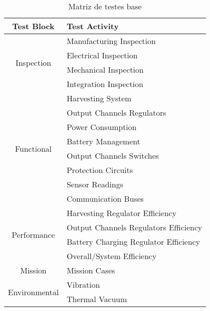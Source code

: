 \begin{table}
    \ABNTEXfontereduzida
    \centering
    \caption{Matriz de testes base}
    \begin{tabular}{cl}
        \toprule
        \textbf{Test Block} & \textbf{Test Activity} \\
        \midrule
        \midrule
        \multirow{4}{*}{Inspection}     & Manufacturing Inspection              \\
                                        & Electrical Inspection                 \\
                                        & Mechanical Inspection                 \\
                                        & Integration Inspection                \\
        \midrule
        \multirow{8}{*}{Functional}     & Harvesting System                     \\
                                        & Output Channels Regulators            \\
                                        & Power Consumption                     \\
                                        & Battery Management            \\
                                        & Output Channels Switches              \\
                                        & Protection Circuits                   \\
                                        & Sensor Readings                       \\
                                        & Communication Buses                   \\
        \midrule
        \multirow{4}{*}{Performance}    & Harvesting Regulator Efficiency       \\
                                        & Output Channels Regulators Efficiency \\
                                        & Battery Charging Regulator Efficiency \\
                                        & Overall/System Efficiency             \\
        \midrule
        Mission                         & Mission Cases                         \\
        \midrule
        \multirow{2}{*}{Environmental}  & Vibration                             \\
                                        & Thermal Vacuum                        \\
        \bottomrule
    \end{tabular}
    \label{tab:matriz-base}
\end{table}


